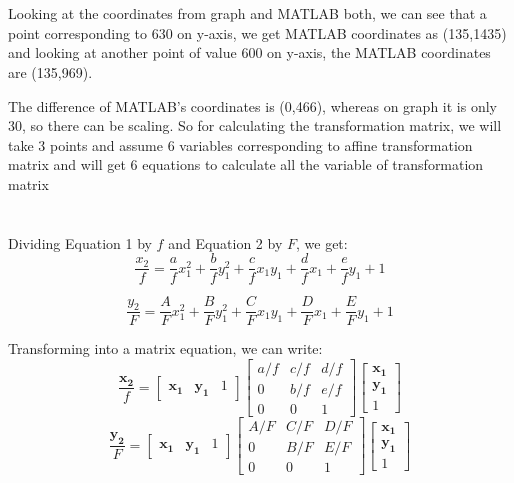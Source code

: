 \documentclass[a4paper, 11pt]{article}
\begin{document}
\vspace{1cm}
\section{}
Looking at the coordinates from graph and MATLAB both, we can see that a point corresponding to 630 on y-axis, we get MATLAB coordinates as (135,1435) and looking at another point of value 600 on y-axis, the MATLAB coordinates are (135,969).

The difference of MATLAB's coordinates is (0,466), whereas on graph it is only 30, so there can be scaling. So for calculating the transformation matrix, we will take 3 points and assume 6 variables corresponding to affine transformation matrix and will get 6 equations to calculate all the variable of transformation matrix 

\newpage
\section{}
Dividing Equation 1 by \( f \) and Equation 2 by \( F \), we get:
\[
    \frac{x_2}{f} = \frac{a}{f}x_1^2 + \frac{b}{f}y_1^2 + \frac{c}{f}x_1y_1 + \frac{d}{f}x_1+\frac{e}{f}y_1+1
\]

\[
    \frac{y_2}{F} = \frac{A}{F}x_1^2 + \frac{B}{F}y_1^2 + \frac{C}{F}x_1y_1 + \frac{D}{F}x_1+\frac{E}{F}y_1+1
\]

Transforming into a matrix equation, we can write:
\[
    \frac{\mathbf{x_2}}{f} = \begin{bmatrix} \mathbf{x_1} & \mathbf{y_1} & 1 \end{bmatrix} \begin{bmatrix} a/f & c/f & d/f\\ 0 & b/f & e/f \\ 0 & 0 & 1 \end{bmatrix}  \begin{bmatrix} \mathbf{x_1}\\ \mathbf{y_1} \\ 1 \end{bmatrix}
\]
\[
    \frac{\mathbf{y_2}}{F} = \begin{bmatrix} \mathbf{x_1} & \mathbf{y_1} & 1 \end{bmatrix} \begin{bmatrix} A/F & C/F & D/F\\ 0 & B/F & E/F \\ 0 & 0 & 1 \end{bmatrix}  \begin{bmatrix} \mathbf{x_1} \\ \mathbf{y_1} \\ 1 \end{bmatrix}
\]
\end{document}
